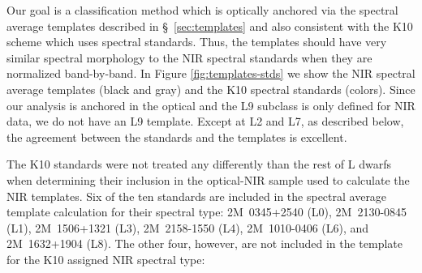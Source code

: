 \documentclass[12pt,preprint]{aastex}
\begin{document}
Our goal is a classification method which is optically anchored via the spectral average templates described in \S~\ref{sec:templates} and also consistent with the K10 scheme which uses spectral standards. 
Thus, the templates should have very similar spectral morphology to the NIR spectral standards when they are normalized band-by-band.
In Figure \ref{fig:templates-stds} we show the NIR spectral average templates (black and gray) and the K10 spectral standards (colors). 
Since our analysis is anchored in the optical and the L9 subclass is only defined for NIR data, we do not have an L9 template.
Except at L2 and L7, as described below, the agreement between the standards and the templates is excellent.

The K10 standards were not treated any differently than the rest of L dwarfs when determining their inclusion in the optical-NIR sample used to calculate the NIR templates. 
Six of the ten standards are included in the spectral average template calculation for their spectral type: 2M~0345+2540 (L0), 2M~2130-0845 (L1), 2M~1506+1321 (L3), 2M~2158-1550 (L4), 2M~1010-0406 (L6), and 2M~1632+1904 (L8).
The other four, however, are not included in the template for the K10 assigned NIR spectral type:
\end{document}
